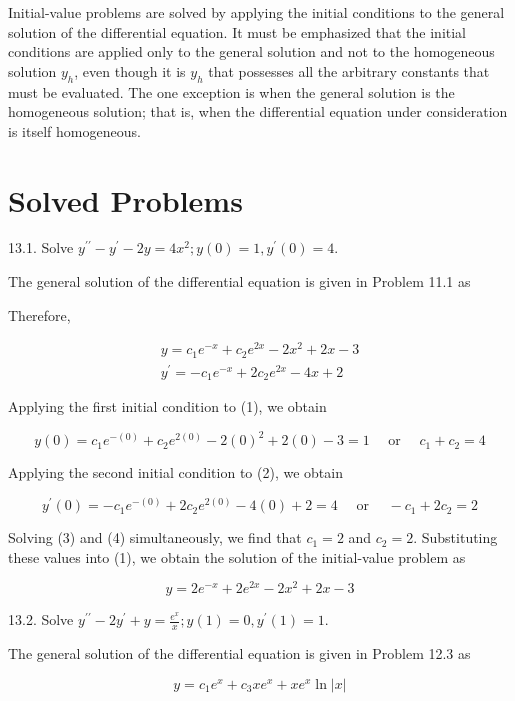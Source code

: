 \documentclass[10pt]{article}
\begin{document}
Initial-value problems are solved by applying the initial conditions to the general solution of the differential equation. It must be emphasized that the initial conditions are applied only to the general solution and not to the homogeneous solution $y_{h}$, even though it is $y_{h}$ that possesses all the arbitrary constants that must be evaluated. The one exception is when the general solution is the homogeneous solution; that is, when the differential equation under consideration is itself homogeneous.

\section*{Solved Problems}
13.1. Solve $y^{\prime \prime}-y^{\prime}-2 y=4 x^{2} ; y(0)=1, y^{\prime}(0)=4$.

The general solution of the differential equation is given in Problem 11.1 as

Therefore,


\begin{gather*}
y=c_{1} e^{-x}+c_{2} e^{2 x}-2 x^{2}+2 x-3  \tag{1}\\
y^{\prime}=-c_{1} e^{-x}+2 c_{2} e^{2 x}-4 x+2 \tag{2}
\end{gather*}


Applying the first initial condition to (1), we obtain


\begin{equation*}
y(0)=c_{1} e^{-(0)}+c_{2} e^{2(0)}-2(0)^{2}+2(0)-3=1 \quad \text { or } \quad c_{1}+c_{2}=4 \tag{3}
\end{equation*}


Applying the second initial condition to (2), we obtain


\begin{equation*}
y^{\prime}(0)=-c_{1} e^{-(0)}+2 c_{2} e^{2(0)}-4(0)+2=4 \quad \text { or } \quad-c_{1}+2 c_{2}=2 \tag{4}
\end{equation*}


Solving (3) and (4) simultaneously, we find that $c_{1}=2$ and $c_{2}=2$. Substituting these values into (1), we obtain the solution of the initial-value problem as

$$
y=2 e^{-x}+2 e^{2 x}-2 x^{2}+2 x-3
$$

13.2. Solve $y^{\prime \prime}-2 y^{\prime}+y=\frac{e^{x}}{x} ; y(1)=0, y^{\prime}(1)=1$.

The general solution of the differential equation is given in Problem 12.3 as


\begin{equation*}
y=c_{1} e^{x}+c_{3} x e^{x}+x e^{x} \ln |x| \tag{1}
\end{equation*}
\end{document}
